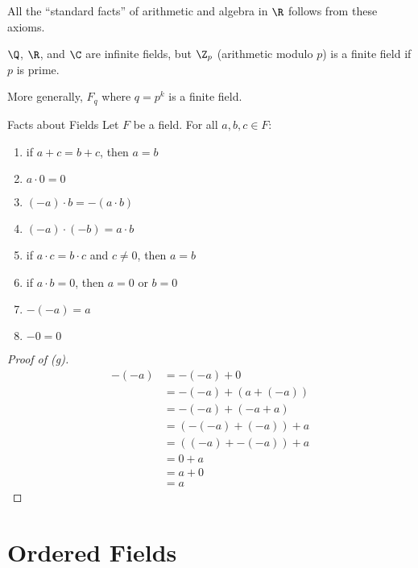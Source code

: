 All the ``standard facts'' of arithmetic and algebra in $\R$ follows from these axioms.

$\Q$, $\R$, and $\C$ are infinite fields, but $\Z_p$ (arithmetic modulo $p$) is a finite field if $p$ is prime.

More generally, $F_q$ where $q = p^k$ is a finite field.

\begin{thmbox}{Facts about Fields}{}
    Let $F$ be a field. For all $a,b,c \in F$:
    \begin{enumerate}[noitemsep,label=(\alph*)]
        \item if $a+c = b+c$, then $a = b$
        \item $a \cdot 0 = 0$
        \item $(-a) \cdot b = -(a \cdot b)$
        \item $(-a) \cdot (-b) = a \cdot b$
        \item if $a \cdot c = b \cdot c$ and $c \neq 0$, then $a = b$
        \item if $a \cdot b = 0$, then $a = 0$ or $b = 0$
        \item $-(-a) = a$
        \item $-0 = 0$
    \end{enumerate}
    \tcblower
    \begin{proof}[Proof of (g)]
        \begin{align*}
            -(-a)
            &= -(-a) + 0 \\
            &= -(-a) + (a + (-a)) \\
            &= -(-a) + (-a + a) \\
            &= \left(-(-a) + (-a) \right) + a \\
            &= \left( (-a) + -(-a) \right) + a \\
            &= 0 + a \\
            &= a + 0 \\
            &= a
        \end{align*}
    \end{proof}
\end{thmbox}

\section{Ordered Fields}

